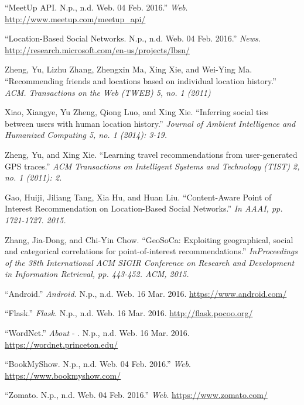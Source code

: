 \documentclass[12pt,letterpaper]{article}
\begin{document}
\begin{thebibliography}{9}
	\enquote{MeetUp API. N.p., n.d. Web. 04 Feb. 2016.} \textit{Web}. \href{http://www.meetup.com/meetup_api/}{\url{http://www.meetup.com/meetup_api/}}	

	\enquote{Location-Based Social Networks. N.p., n.d. Web. 04 Feb. 2016.} \textit{News}. \href{http://research.microsoft.com/en-us/projects/lbsn/}{\url{http://research.microsoft.com/en-us/projects/lbsn/}}
	
	Zheng, Yu, Lizhu Zhang, Zhengxin Ma, Xing Xie, and Wei-Ying Ma. \enquote{Recommending friends and locations based on individual location history.} \textit{ACM. Transactions on the Web (TWEB) 5, no. 1 (2011)}

	Xiao, Xiangye, Yu Zheng, Qiong Luo, and Xing Xie. \enquote{Inferring social ties between users with human location history.} \textit{Journal of Ambient Intelligence and Humanized Computing 5, no. 1 (2014): 3-19.}
	
	Zheng, Yu, and Xing Xie. \enquote{Learning travel recommendations from user-generated GPS traces.} \textit{ACM Transactions on Intelligent Systems and Technology (TIST) 2, no. 1 (2011): 2.}

	Gao, Huiji, Jiliang Tang, Xia Hu, and Huan Liu. \enquote{Content-Aware Point of Interest Recommendation on Location-Based Social Networks.} \textit{In AAAI, pp. 1721-1727. 2015.}

	Zhang, Jia-Dong, and Chi-Yin Chow. \enquote{GeoSoCa: Exploiting geographical, social and categorical correlations for point-of-interest recommendations.} \textit{InProceedings of the 38th International ACM SIGIR Conference on Research and Development in Information Retrieval, pp. 443-452. ACM, 2015.}

	\enquote{Android.} \textit{Android.}	N.p., n.d. Web. 16 Mar. 2016. \href{https://www.android.com/}{\url{https://www.android.com/}}
	
	\enquote{Flask.} \textit{Flask.}	N.p., n.d. Web. 16 Mar. 2016. \href{http://flask.pocoo.org/}{\url{http://flask.pocoo.org/}}
	
	\enquote{WordNet.} \textit{About} - . N.p., n.d. Web. 16 Mar. 2016. \href{https://wordnet.princeton.edu/}{\url{https://wordnet.princeton.edu/}}


	\enquote{BookMyShow. N.p., n.d. Web. 04 Feb. 2016.} \textit{Web}. \href{https://www.bookmyshow.com/}{\url{https://www.bookmyshow.com/}}
	
	\enquote{Zomato. N.p., n.d. Web. 04 Feb. 2016.} \textit{Web}. \href{https://www.zomato.com/}{\url{https://www.zomato.com/}}

\end{thebibliography}
\end{document}
